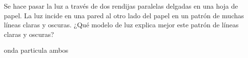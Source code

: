 Se hace pasar la luz a través de dos rendijas paralelas delgadas en una hoja de papel. La luz incide en una pared al otro lado del papel en un patrón de muchas líneas claras y oscuras.
¿Qué modelo de luz explica mejor este patrón de líneas claras y oscuras?

\begin{oneparchoices}
    \CorrectChoice onda
    \choice particula
    \choice ambos
\end{oneparchoices}
